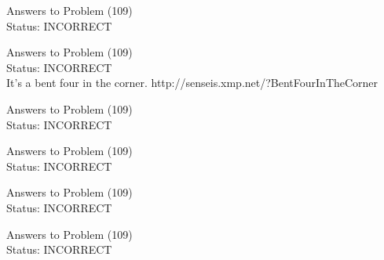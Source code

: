 \documentclass[11pt]{article}
\begin{document}
\begin{minipage}[t]{0.5\textwidth}
  {\centering
  
  Answers to Problem (109)\\
  Status: INCORRECT\\
  
  }
\end{minipage}
\begin{minipage}[t]{0.5\textwidth}
  {\centering
  
  Answers to Problem (109)\\
  Status: INCORRECT\\
  It's a bent four in the corner. 
http://senseis.xmp.net/?BentFourInTheCorner\\
  }
\end{minipage}
\begin{minipage}[t]{0.5\textwidth}
  {\centering
  
  Answers to Problem (109)\\
  Status: INCORRECT\\
  
  }
\end{minipage}
\begin{minipage}[t]{0.5\textwidth}
  {\centering
  
  Answers to Problem (109)\\
  Status: INCORRECT\\
  
  }
\end{minipage}
\begin{minipage}[t]{0.5\textwidth}
  {\centering
  
  Answers to Problem (109)\\
  Status: INCORRECT\\
  
  }
\end{minipage}
\begin{minipage}[t]{0.5\textwidth}
  {\centering
  
  Answers to Problem (109)\\
  Status: INCORRECT\\
  
  }
\end{minipage}
\end{document}
